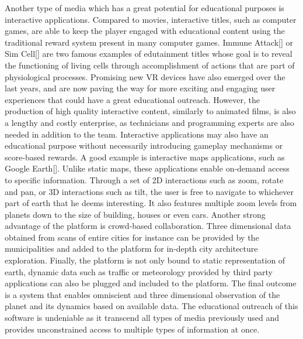 
Another type of media which has a great potential for educational purposes is interactive applications.
Compared to movies, interactive titles, such as computer games, are able to keep the player engaged with educational content using the traditional reward system present in many computer games.
Immune Attack[] or Sim Cell[] are two famous examples of edutainment titles whose goal is to reveal the functioning of living cells through accomplishment of actions that are part of physiological processes.
Promising new VR devices have also emerged over the last years, and are now paving the way for more exciting and engaging user experiences that could have a great educational outreach.
However, the production of high quality interactive content, similarly to animated films, is also a lengthy and costly enterprise, as technicians and programming experts are also needed in addition to the team.
Interactive applications may also have an educational purpose without necessarily introducing gameplay mechanisms or score-based rewards. 
A good example is interactive maps applications, such as Google Earth[].
Unlike static maps, these applications enable on-demand access to specific information.
Through a set of 2D interactions such as zoom, rotate and pan, or 3D interactions such as tilt, the user is free to navigate to whichever part of earth that he deems interesting.
It also features multiple zoom levels from planets down to the size of building, houses or even cars.
Another strong advantage of the platform is crowd-based collaboration.
Three dimensional data obtained from scans of entire cities for instance can be provided by the municipalities and added to the platform for in-depth city architecture exploration.
Finally, the platform is not only bound to static representation of earth, dynamic data such as traffic or meteorology provided by third party applications can also be plugged and included to the platform.
The final outcome is a system that enables omniscient and three dimensional observation of the planet and its dynamics based on available data.
The educational outreach of this software is undeniable as it transcend all types of media previously used and provides unconstrained access to multiple types of information at once. 


